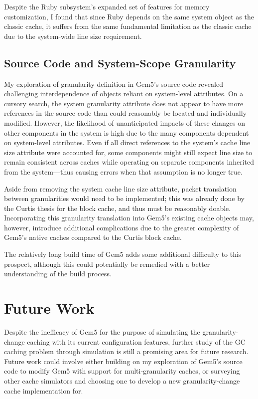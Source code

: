 \documentclass[12pt,twoside]{reedthesis}
\begin{document}
	Despite the Ruby subsystem's expanded set of features for memory customization, I found that since Ruby depends on the same system object as the classic cache, it suffers from the same fundamental limitation as the classic cache due to the system-wide line size requirement.

	\subsection*{Source Code and System-Scope Granularity}

	My exploration of granularity definition in Gem5's source code revealed challenging interdependence of objects reliant on system-level attributes. On a cursory search, the system granularity attribute does not appear to have more references in the source code than could reasonably be located and individually modified. However, the likelihood of unanticipated impacts of these changes on other components in the system is high due to the many components dependent on system-level attributes. Even if all direct references to the system's cache line size attribute were accounted for, some components might still expect line size to remain consistent across caches while operating on separate components inherited from the system---thus causing errors when that assumption is no longer true.

	Aside from removing the system cache line size attribute, packet translation between granularities would need to be implemented; this was already done by the Curtis thesis for the block cache, and thus must be reasonably doable. Incorporating this granularity translation into Gem5's existing cache objects may, however, introduce additional complications due to the greater complexity of Gem5's native caches compared to the Curtis block cache.

	The relatively long build time of Gem5 adds some additional difficulty to this prospect, although this could potentially be remedied with a better understanding of the build process.

\section{Future Work}

	Despite the inefficacy of Gem5 for the purpose of simulating the granularity-change caching with its current configuration features, further study of the GC caching problem through simulation is still a promising area for future research. Future work could involve either building on my exploration of Gem5's source code to modify Gem5 with support for multi-granularity caches, or surveying other cache simulators and choosing one to develop a new granularity-change cache implementation for.
\end{document}
